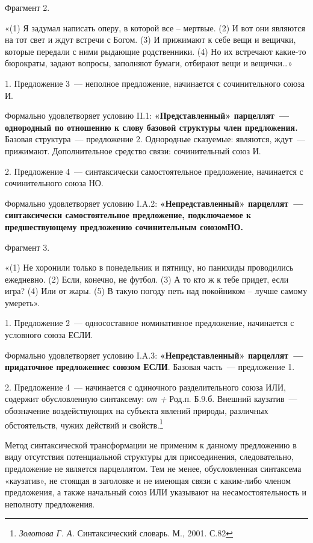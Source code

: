 \documentclass{kursa4}
\begin{document}
      {Фрагмент 2. }

      {«(1) Я задумал написать оперу, в которой все – мертвые. (2) И вот они являются на тот свет и ждут встречи с Богом. (3) И прижимают к себе вещи и вещички, которые передали с ними рыдающие родственники. (4) Но их встречают какие-то бюрократы, задают вопросы, заполняют бумаги, отбирают вещи и вещички…»}

      {1. Предложение 3~--- неполное предложение, начинается с сочинительного союза И.}

      {Формально удовлетворяет условию II.1:
      }\textbf{{«Представленный» парцеллят~--- однородный по отношению к слову базовой структуры член предложения.
      }}{Базовая структура~--- предложение 2. Однородные сказуемые: являются, ждут~--- прижимают. Дополнительное средство связи: сочинительный союз И.}

      {2. Предложение 4~--- синтаксически самостоятельное предложение, начинается с сочинительного союза НО.}



      Формально удовлетворяет условию I.A.2: \textbf{«Непредставленный» парцеллят~--- синтаксически самостоятельное предложение, подключаемое к предшествующему предложению сочинительным союзомНО.}

      {Фрагмент 3.}

      {«(1) Не хоронили только в понедельник и пятницу, но панихиды проводились ежедневно. (2) Если, конечно, не футбол. (3) А то кто ж к тебе придет, если игра? (4) Или от жары. (5)
      }{В такую погоду петь над покойником – лучше самому умереть».}

      {1. Предложение 2~--- односоставное номинативное предложение, начинается с условного союза ЕСЛИ.}

      Формально удовлетворяет условию I.A.3: \textbf{«Непредставленный» парцеллят~--- придаточное предложениес союзом ЕСЛИ}. Базовая часть~--- предложение 1.

      {2. Предложение 4~--- начинается с одиночного разделительного союза ИЛИ, содержит обусловленную синтаксему:
      }\textit{{от + }}{Род.п. Б.9.б. Внешний каузатив~--- обозначение воздействующих на субъекта явлений природы, различных обстоятельств, чужих действий и свойств.}\footnote{\textit{ Золотова Г. А.} Синтаксический словарь. М., 2001. С.82}

      Метод синтаксической трансформации не применим к данному предложению в виду отсутствия потенциальной структуры для присоединения, следовательно, предложение не является парцеллятом. Тем не менее, обусловленная синтаксема «каузатив», не стоящая в заголовке и не имеющая связи с каким-либо членом предложения, а также начальный союз ИЛИ указывают на несамостоятельность и неполноту предложения. 
\end{document}
